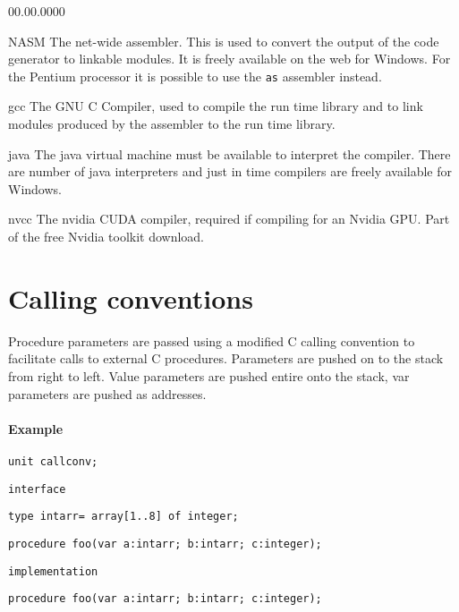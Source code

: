 {\begin{lyxlist}{00.00.0000}
\item [NASM]The net-wide assembler. This is used to convert the output of the code
generator to linkable modules. It is freely available on the web for Windows.
For the Pentium processor it is possible to use the {\tt as} assembler instead.
\item [gcc]The GNU C Compiler, used to compile the run time library and to link modules
produced by the assembler to the run time library.
\item [java]The java virtual machine must be available to interpret the compiler.
There are number of java interpreters and just in time compilers are freely available
for Windows.
\item [nvcc]The nvidia CUDA compiler, required if compiling for an Nvidia GPU. 
Part of the free Nvidia toolkit download.
\end{lyxlist}


\section{Calling conventions}

Procedure parameters are passed using a modified C calling convention to facilitate
calls to external C procedures. Parameters are pushed on to the stack from right
to left. Value parameters are pushed entire onto the stack, var parameters are
pushed as addresses.


\paragraph{Example }

\begin{lyxcode}
\textrm{\texttt{\small unit~callconv;}}{\small \par}

\textrm{\texttt{\small interface}}{\small \par}

\textrm{\texttt{\small type~intarr=~array{[}1..8{]}~of~integer;}}{\small \par}

\textrm{\texttt{\small procedure~foo(var~a:intarr;~b:intarr;~c:integer);}}{\small \par}

\textrm{\texttt{\small implementation}}{\small \par}

\textrm{\texttt{\small procedure~foo(var~a:intarr;~b:intarr;~c:integer);}}{\small \par}


\end{lyxcode}}
